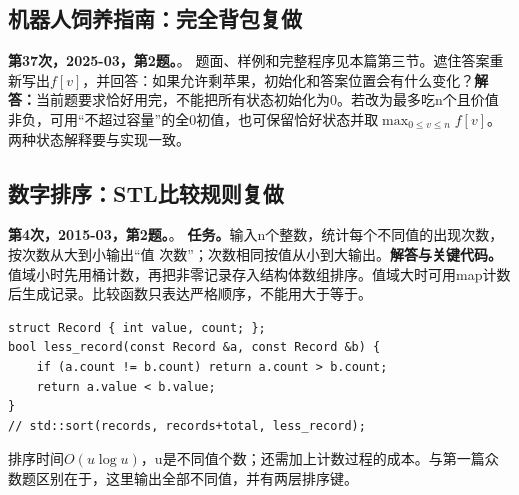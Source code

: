 \subsection{机器人饲养指南：完全背包复做}
\textbf{第37次，2025-03，第2题。}。
题面、样例和完整程序见本篇第三节。遮住答案重新写出$f[v]$，并回答：如果允许剩苹果，初始化和答案位置会有什么变化？\textbf{解答：}当前题要求恰好用完，不能把所有状态初始化为0。若改为最多吃n个且价值非负，可用“不超过容量”的全0初值，也可保留恰好状态并取$\max_{0\le v\le n}f[v]$。两种状态解释要与实现一致。
\subsection{数字排序：STL比较规则复做}
\textbf{第4次，2015-03，第2题。}。
\textbf{任务。}输入n个整数，统计每个不同值的出现次数，按次数从大到小输出“值 次数”；次数相同按值从小到大输出。\textbf{解答与关键代码。}值域小时先用桶计数，再把非零记录存入结构体数组排序。值域大时可用map计数后生成记录。比较函数只表达严格顺序，不能用大于等于。
\begin{lstlisting}
struct Record { int value, count; };
bool less_record(const Record &a, const Record &b) {
    if (a.count != b.count) return a.count > b.count;
    return a.value < b.value;
}
// std::sort(records, records+total, less_record);
\end{lstlisting}
排序时间$O(u\log u)$，u是不同值个数；还需加上计数过程的成本。与第一篇众数题区别在于，这里输出全部不同值，并有两层排序键。
